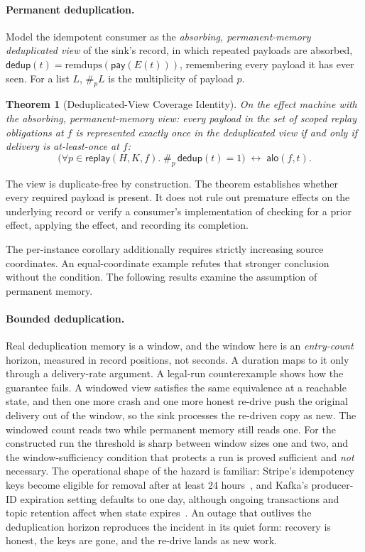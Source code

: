 \documentclass[sigplan,10pt]{acmart}
\theoremstyle{plain}
\newtheorem{theorem}{Theorem}
\theoremstyle{definition}
\newcommand{\replay}{\mathsf{replay}}      %
\newcommand{\scope}{K}                     %
\newcommand{\pay}{\mathsf{pay}}            %
\newcommand{\alo}{\mathsf{alo}}            %
\newcommand{\dedupv}{\mathsf{dedup}}       %
\begin{document}
\paragraph{Permanent deduplication.}
Model the idempotent consumer as the \emph{absorbing, permanent-memory
deduplicated view} of the sink's record, in which repeated payloads are
absorbed,
$\dedupv(t) = \mathrm{remdups}(\pay(E(t)))$, remembering every payload
it has ever seen. For a list $L$, $\#_p L$ is the multiplicity of
payload $p$.

\begin{theorem}[Deduplicated-View Coverage Identity]\label{thm:dedup}
On the effect machine with the absorbing, permanent-memory view: every
payload in the set of scoped replay obligations at $f$ is represented
exactly once in the deduplicated view if and only if delivery is
at-least-once at $f$:
\[
  \bigl(\forall p \in \replay(H,\scope,f).\;
        \#_p\,\dedupv(t) = 1\bigr)
  \;\longleftrightarrow\; \alo(f,t).
\]
\end{theorem}

The view is duplicate-free by construction. The theorem establishes
whether every required payload is present. It does not rule out
premature effects on the underlying record or verify a consumer's
implementation of checking for a prior effect, applying the effect,
and recording its completion.

The per-instance corollary additionally requires strictly increasing
source coordinates. An equal-coordinate example refutes that
stronger conclusion without the condition. The following results
examine the assumption of permanent memory.

\paragraph{Bounded deduplication.}
Real deduplication memory is a window, and the window here is an
\emph{entry-count} horizon, measured in record positions, not
seconds. A duration maps to it only through a delivery-rate argument.
A legal-run counterexample shows how the guarantee fails. A windowed view satisfies the same
equivalence at a reachable state, and then one more crash and one more
honest re-drive push the original delivery out of the window, so the
sink processes the re-driven copy as new. The windowed count reads
two while permanent memory still reads one. For the constructed run
the threshold is sharp between window sizes one and two, and the
window-sufficiency condition that protects a run is proved sufficient
and \emph{not} necessary. The operational shape of the hazard is
familiar: Stripe's idempotency keys become eligible for removal after
at least 24 hours~\cite{stripe}, and Kafka's producer-ID expiration setting defaults to one day,
although ongoing transactions and topic retention affect when state
expires~\cite{kafka-exp}. An
outage that outlives the deduplication horizon reproduces the
incident in its quiet form: recovery is honest, the keys are gone, and
the re-drive lands as new work.
\end{document}
